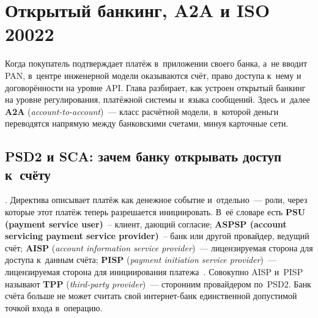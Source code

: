 \chapter{Открытый банкинг, A2A и ISO 20022}\label{ch:open-banking}
Когда покупатель подтверждает платёж в~приложении своего банка, а~не
вводит PAN, в~центре инженерной модели оказываются счёт, право
доступа к~нему и договорённости на уровне API. Глава разбирает, как
устроен открытый банкинг на уровне регулирования, платёжной системы
и~языка сообщений. Здесь и~далее \textbf{A2A} (\textit{account-to-account})~---
класс расчётной модели, в~которой деньги переводятся напрямую между
банковскими счетами, минуя карточные сети.

\section{PSD2 и SCA: зачем банку открывать доступ к~счёту}\label{sec:psd2-sca}


. Директива описывает платёж как денежное
событие и~отдельно~--- роли, через которые этот платёж теперь
разрешается инициировать. В~её словаре есть \textbf{PSU (payment
service user)}~-- клиент, дающий согласие; \textbf{ASPSP (account
servicing payment service provider)}~-- банк или другой провайдер,
ведущий счёт; \textbf{AISP} (\textit{account information service provider})~---
лицензируемая сторона для доступа к~данным счёта;
\textbf{PISP} (\textit{payment initiation service provider})~--- лицензируемая
сторона для инициирования платежа~\cite{psd2}. Совокупно AISP и~PISP
называют \textbf{TPP} (\textit{third-party provider})~--- сторонним
провайдером по~PSD2. Банк счёта больше не может считать свой
интернет-банк единственной допустимой точкой входа в~операцию.

